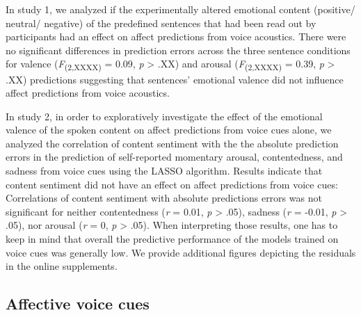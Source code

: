 \documentclass[
  english,
  man,floatsintext]{apa6}
\begin{document}
In study 1, we analyzed if the experimentally altered emotional content (positive/ neutral/ negative) of the predefined sentences that had been read out by participants had an effect on affect predictions from voice acoustics. There were no significant differences in prediction errors across the three sentence conditions for valence (\emph{F}\textsubscript{(2,XXXX)} = 0.09,
\emph{p} \textgreater{} .XX) and arousal (\emph{F}\textsubscript{(2,XXXX)} = 0.39,
\emph{p} \textgreater{} .XX) predictions suggesting that sentences' emotional valence did not influence affect predictions from voice acoustics.

In study 2, in order to exploratively investigate the effect of the emotional valence of the spoken content on affect predictions from voice cues alone, we analyzed the correlation of content sentiment with the the absolute prediction errors in the prediction of self-reported momentary arousal, contentedness, and sadness from voice cues using the LASSO algorithm. Results indicate that content sentiment did not have an effect on affect predictions from voice cues: Correlations of content sentiment with absolute predictions errors was not significant for neither contentedness (\emph{r} = 0.01, \emph{p} \textgreater{} .05), sadness (\emph{r} = -0.01, \emph{p} \textgreater{} .05), nor arousal (\emph{r} = 0, \emph{p} \textgreater{} .05). When interpreting those results, one has to keep in mind that overall the predictive performance of the models trained on voice cues was generally low. We provide additional figures depicting the residuals in the online supplements.

\hypertarget{affective-voice-cues}{%
\subsection{Affective voice cues}\label{affective-voice-cues}}
\end{document}
